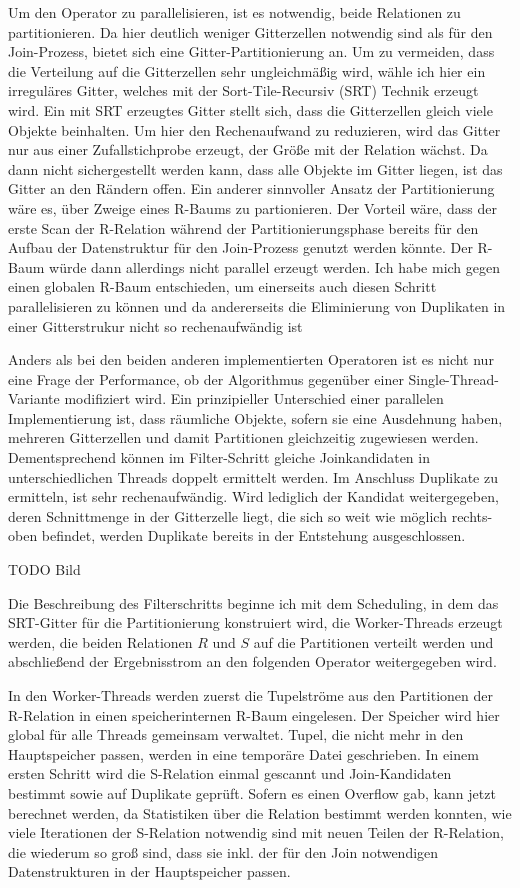 \documentclass[a4paper,12pt,twoside]{article}
\begin{document}
Um den Operator zu parallelisieren, ist es notwendig, beide Relationen zu partitionieren. Da hier deutlich weniger Gitterzellen notwendig sind als für den Join-Prozess, bietet sich eine Gitter-Partitionierung an. Um zu vermeiden, dass die Verteilung auf die Gitterzellen sehr ungleichmäßig wird, wähle ich hier ein irreguläres Gitter, welches mit der Sort-Tile-Recursiv (SRT) Technik erzeugt wird. Ein mit SRT erzeugtes Gitter stellt sich, dass die Gitterzellen gleich viele Objekte beinhalten. Um hier den Rechenaufwand zu reduzieren, wird das Gitter nur aus einer Zufallstichprobe erzeugt, der Größe mit der Relation wächst. Da dann nicht sichergestellt werden kann, dass alle Objekte im Gitter liegen, ist das Gitter an den Rändern offen. Ein anderer sinnvoller Ansatz der Partitionierung wäre es, über Zweige eines R-Baums zu partionieren. Der Vorteil wäre, dass der erste Scan der R-Relation während der Partitionierungsphase bereits für den Aufbau der Datenstruktur für den Join-Prozess genutzt werden könnte. Der R-Baum würde dann allerdings nicht parallel erzeugt werden. Ich habe mich gegen einen globalen R-Baum entschieden, um einerseits auch diesen Schritt parallelisieren zu können und da andererseits die Eliminierung von Duplikaten in einer Gitterstrukur nicht so rechenaufwändig ist
 
Anders als bei den beiden anderen implementierten Operatoren ist es nicht nur eine Frage der Performance, ob der Algorithmus gegenüber einer Single-Thread-Variante modifiziert wird. Ein prinzipieller Unterschied einer parallelen Implementierung ist, dass räumliche Objekte, sofern sie eine Ausdehnung haben, mehreren Gitterzellen und damit Partitionen gleichzeitig zugewiesen werden. Dementsprechend können im Filter-Schritt gleiche Joinkandidaten in unterschiedlichen Threads doppelt ermittelt werden. Im Anschluss Duplikate zu ermitteln, ist sehr rechenaufwändig. Wird lediglich der Kandidat weitergegeben, deren Schnittmenge in der Gitterzelle liegt, die sich so weit wie möglich rechts-oben befindet, werden Duplikate bereits in der Entstehung ausgeschlossen.

TODO Bild

Die Beschreibung des Filterschritts beginne ich mit dem Scheduling, in dem das SRT-Gitter für die Partitionierung konstruiert wird, die Worker-Threads erzeugt werden, die beiden Relationen $R$ und $S$ auf die Partitionen verteilt werden und abschließend der Ergebnisstrom an den folgenden Operator weitergegeben wird.

In den Worker-Threads werden zuerst die Tupelströme aus den Partitionen der R-Relation in einen speicherinternen R-Baum eingelesen. Der Speicher wird hier global für alle Threads gemeinsam verwaltet. Tupel, die nicht mehr in den Hauptspeicher passen, werden in eine temporäre Datei geschrieben. In einem ersten Schritt wird die S-Relation einmal gescannt und Join-Kandidaten bestimmt sowie auf Duplikate geprüft.  Sofern es einen Overflow gab, kann jetzt berechnet werden, da Statistiken über die Relation bestimmt werden konnten, wie viele Iterationen der S-Relation notwendig sind mit neuen Teilen der R-Relation, die wiederum so groß sind, dass sie inkl. der für den Join notwendigen Datenstrukturen in der Hauptspeicher passen.
\end{document}
